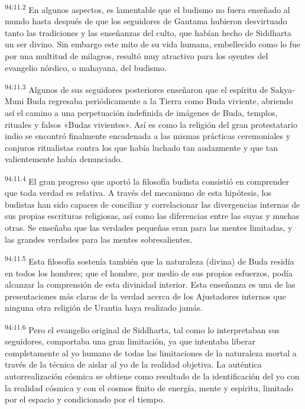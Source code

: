 \par
\textsuperscript{94:11.2} En algunos aspectos, es lamentable que el budismo no fuera enseñado al mundo hasta después de que los seguidores de Gautama hubieron desvirtuado tanto las tradiciones y las enseñanzas del culto, que habían hecho de Siddharta un ser divino. Sin embargo este mito de su vida humana, embellecido como lo fue por una multitud de milagros, resultó muy atractivo para los oyentes del evangelio nórdico, o mahayana, del budismo.

\par
\textsuperscript{94:11.3} Algunos de sus seguidores posteriores enseñaron que el espíritu de Sakya-Muni Buda regresaba periódicamente a la Tierra como Buda viviente, abriendo así el camino a una perpetuación indefinida de imágenes de Buda, templos, rituales y falsos «Budas vivientes». Así es como la religión del gran protestatario indio se encontró finalmente encadenada a las mismas prácticas ceremoniales y conjuros ritualistas contra los que había luchado tan audazmente y que tan valientemente había denunciado.

\par
\textsuperscript{94:11.4} El gran progreso que aportó la filosofía budista consistió en comprender que toda verdad es relativa. A través del mecanismo de esta hipótesis, los budistas han sido capaces de conciliar y correlacionar las divergencias internas de sus propias escrituras religiosas, así como las diferencias entre las suyas y muchas otras. Se enseñaba que las verdades pequeñas eran para las mentes limitadas, y las grandes verdades para las mentes sobresalientes.

\par
\textsuperscript{94:11.5} Esta filosofía sostenía también que la naturaleza (divina) de Buda residía en todos los hombres; que el hombre, por medio de sus propios esfuerzos, podía alcanzar la comprensión de esta divinidad interior. Esta enseñanza es una de las presentaciones más claras de la verdad acerca de los Ajustadores internos que ninguna otra religión de Urantia haya realizado jamás.

\par
\textsuperscript{94:11.6} Pero el evangelio original de Siddharta, tal como lo interpretaban sus seguidores, comportaba una gran limitación, ya que intentaba liberar completamente al yo humano de todas las limitaciones de la naturaleza mortal a través de la técnica de aislar al yo de la realidad objetiva. La auténtica autorrealización cósmica se obtiene como resultado de la identificación del yo con la realidad cósmica y con el cosmos finito de energía, mente y espíritu, limitado por el espacio y condicionado por el tiempo.


